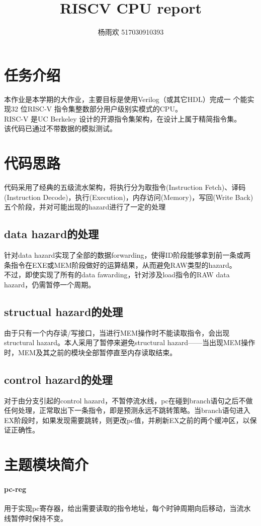\documentclass{article}
\begin{document}
\setlength{\parindent}{2em}
\title{RISCV CPU report}
\author{杨雨欢 517030910393}
\maketitle
\section{任务介绍}
本作业是本学期的大作业，主要目标是使用Verilog（或其它HDL）完成一
个能实现32 位RISC-V 指令集整数部分用户级别实模式的CPU。\\
\indent
RISC-V 是UC Berkeley 设计的开源指令集架构，在设计上属于精简指令集。\\
\indent
该代码已通过不带数据的模拟测试。
\section{代码思路}
代码采用了经典的五级流水架构，将执行分为取指令(Instruction Fetch)、译码(Instruction Decode)，执行(Execution)，内存访问(Memory)，写回(Write Back)五个阶段，并对可能出现的hazard进行了一定的处理
\subsection{data hazard的处理}
针对data hazard实现了全部的数据forwarding，使得ID阶段能够拿到前一条或两条指令在EXE或MEM阶段做好的运算结果，从而避免RAW类型的hazard。\\
\indent
不过，即使实现了所有的data fawarding，针对涉及load指令的RAW data hazard，仍需暂停一个周期。
\subsection{structual hazard的处理}
由于只有一个内存读/写接口，当进行MEM操作时不能读取指令，会出现structural hazard。本人采用了暂停来避免structural hazard——当出现MEM操作时，MEM及其之前的模块全部暂停直至内存读取结束。
\subsection{control hazard的处理}
对于由分支引起的control hazard，不暂停流水线，pc在碰到branch语句之后不做任何处理，正常取出下一条指令，即是预测永远不跳转策略。当branch语句进入EX阶段时，如果发现需要跳转，则更改pc值，并刷新EX之前的两个缓冲区，以保证正确性。
\section{主题模块简介}
\paragraph{pc-reg}用于实现pc寄存器，给出需要读取的指令地址，每个时钟周期向后移动，当流水线暂停时保持不变。
\end{document}
